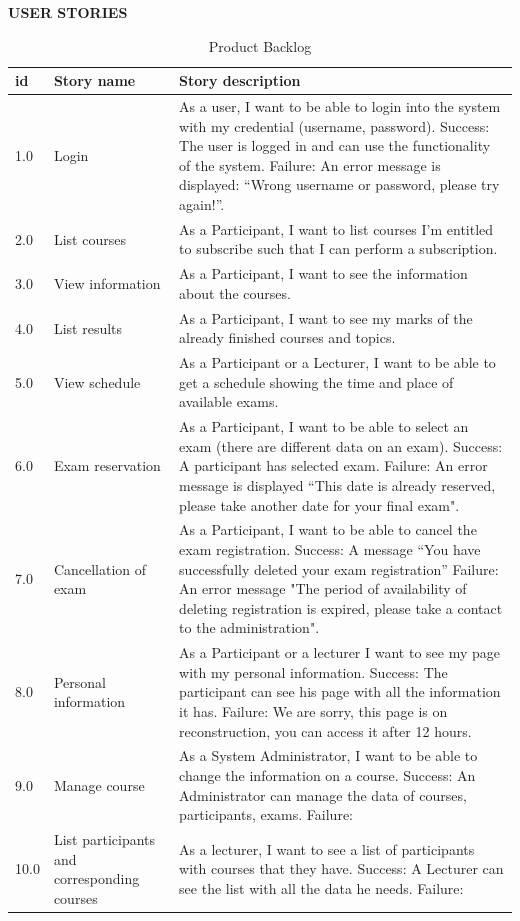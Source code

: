 \documentclass{scrartcl}
\begin{document}
  \begin{table}[H]
\begin{center}
\textbf{USER STORIES }\\[1cm]
\begin{tabular}{| p{2.5cm}| p{4cm} | p{9cm} |}
\hline
\textbf{id} & \textbf{Story name} & \textbf{Story description}\\
\hline      
	
	1.0 & Login & As a user, I want to be able to login into the system with my credential (username, password).
 Success: The user is logged in and can use the functionality of the system.
 Failure: An error message is displayed: “Wrong username or password, please try again!”. \\ \hline
	2.0 & List courses & As a Participant, I want to list courses I'm entitled to subscribe such that I can perform a subscription. \\ \hline
	3.0 & View information & As a Participant, I want to see the information about the courses. \\ \hline
	4.0 & List results & As a Participant, I want to see my marks of the already finished courses and topics. \\ \hline
	5.0 & View schedule & As a Participant or a Lecturer, I want to be able to get a schedule showing the time and place of available exams. \\ \hline
	6.0 & Exam reservation & As a Participant, I want to be able to select an exam (there are different data on an exam).
 Success: A participant has selected exam.
 Failure: An error message is displayed “This date is already reserved, please take another date for your final exam". \\ \hline
	7.0 & Cancellation of exam & As a Participant, I want to be able to cancel the exam registration.
 Success: A message “You have successfully deleted your exam registration”
 Failure: An error message "The period of availability of deleting registration is expired, please take a contact to the administration". \\ \hline
	8.0 & Personal information & As a Participant or a lecturer I want to see my page with my personal information.
 Success: The participant can see his page with all the information it has.
 Failure: We are sorry, this page is on reconstruction, you can access it after 12 hours. \\ \hline
	9.0 & Manage course & As a System Administrator, I want to be able to change the information on a course.
 Success: An Administrator can manage the data of courses, participants, exams.
 Failure: \\ \hline
	10.0 & List participants and corresponding courses & As a lecturer, I want to see a list of participants with courses that they have.
 Success: A Lecturer can see the list with all the data he needs.
 Failure: \\ \hline


        
        \end{tabular}
\end{center}
\caption{Product Backlog}
\label{table2}
\end{table}
\end{document}
